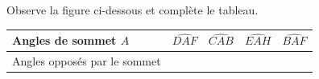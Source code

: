 %
%
Observe la figure ci-dessous et complète le tableau.

    \begin{center}
        \begin{tabularx}{.8\linewidth}{|l|*{4}{Y|}}
            \hline
            Angles de sommet $A$         & $\widehat{DAF}$ & $\widehat{CAB}$ & $\widehat{EAH}$ & $\widehat{BAF}$ \\
            \hline
            Angles opposés par le sommet &                 &                 &                 &                 \\
            \hline
        \end{tabularx}
    \end{center}
